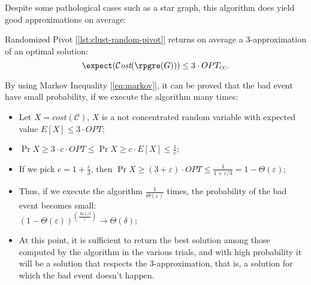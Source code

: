 Despite some pathological cases such as a star graph, this algorithm does yield good approximations on average:

\begin{theorem}\label{thm:clust-rp-approx}
    Randomized Pivot [\ref{lst:clust-random-pivot}] returns on average a 3-approximation of an optimal solution:
    \[
        \expect(\cost(\rpgre(G))) \leq 3 \cdot OPT_\textsc{cc}.
    \]
\end{theorem}

\begin{obs}\label{obs:clust-4}
    By using Markov Inequality [\ref{eq:markov}], it can be proved that the bad event have small probability, if we execute the algorithm many times:
    \begin{itemize}
        \item Let $X=cost(\mathscr{C})$, $X$ is a not concentrated random variable with expected value $E[X] \leq 3 \cdot OPT$;
        \item $\Pr{X \geq 3 \cdot c \cdot OPT} \leq \Pr{X \geq c \cdot E[X]} \leq \frac{1}{c}$;
        \item If we pick $c=1+\frac{\varepsilon}{3}$, then $\Pr{X \geq (3 + \varepsilon) \cdot OPT} \leq \frac{1}{1 + \varepsilon / 3} = 1 - \Theta(\varepsilon)$;
        \item Thus, if we execute the algorithm $\frac{1}{\Theta(\varepsilon)}$ times, the probability of the bad event becomes small:\\
        $\left( 1 - \Theta(\varepsilon) \right)^{\left( \frac{\ln 1/\delta}{\varepsilon} \right)} \to \Theta(\delta)$;
        \item At this point, it is sufficient to return the best solution among those computed by the algorithm in the various trials, and with high probability it will be a solution that respects the 3-approximation, that is, a solution for which the bad event doesn't happen.
    \end{itemize}
\end{obs}

